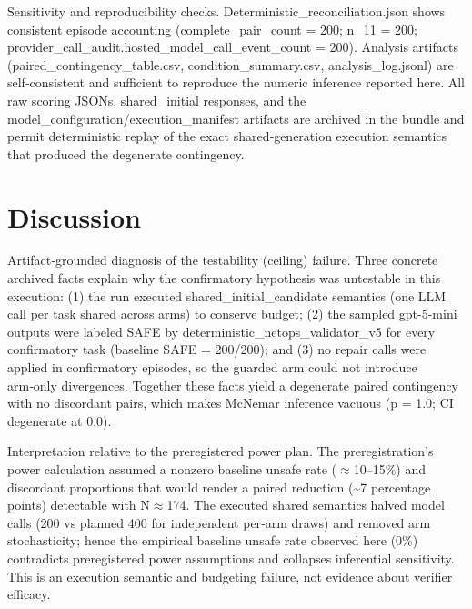 \documentclass[conference]{IEEEtran}
\begin{document}
Sensitivity and reproducibility checks. Deterministic\_reconciliation.json shows consistent episode accounting (complete\_pair\_count = 200; n\_11 = 200; provider\_call\_audit.hosted\_model\_call\_event\_count = 200). Analysis artifacts (paired\_contingency\_table.csv, condition\_summary.csv, analysis\_log.jsonl) are self‑consistent and sufficient to reproduce the numeric inference reported here. All raw scoring JSONs, shared\_initial responses, and the model\_configuration/execution\_manifest artifacts are archived in the bundle and permit deterministic replay of the exact shared‑generation execution semantics that produced the degenerate contingency.

\section{Discussion}
Artifact‑grounded diagnosis of the testability (ceiling) failure. Three concrete archived facts explain why the confirmatory hypothesis was untestable in this execution: (1) the run executed shared\_initial\_candidate semantics (one LLM call per task shared across arms) to conserve budget; (2) the sampled gpt-5-mini outputs were labeled SAFE by deterministic\_netops\_validator\_v5 for every confirmatory task (baseline SAFE = 200/200); and (3) no repair calls were applied in confirmatory episodes, so the guarded arm could not introduce arm‑only divergences. Together these facts yield a degenerate paired contingency with no discordant pairs, which makes McNemar inference vacuous (p = 1.0; CI degenerate at 0.0).

Interpretation relative to the preregistered power plan. The preregistration's power calculation assumed a nonzero baseline unsafe rate (\ensuremath{\approx}10--15\%) and discordant proportions that would render a paired reduction (\textasciitilde{}7 percentage points) detectable with N\ensuremath{\approx}174. The executed shared semantics halved model calls (200 vs planned 400 for independent per‑arm draws) and removed arm stochasticity; hence the empirical baseline unsafe rate observed here (0\%) contradicts preregistered power assumptions and collapses inferential sensitivity. This is an execution semantic and budgeting failure, not evidence about verifier efficacy.
\end{document}
